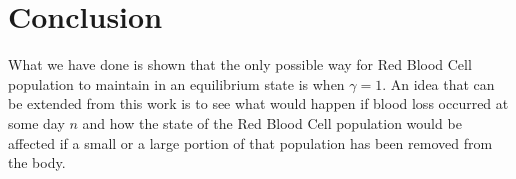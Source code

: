 \section{Conclusion}
\label{sec:conclusion}

What we have done is shown that the only possible way for Red Blood Cell population to maintain in an equilibrium state is when $\gamma = 1$. An idea that can be extended from this work is to see what would happen if blood loss occurred at some day $n$ and how the state of the Red Blood Cell population would be affected if a small or a large portion of that population has been removed from the body.
